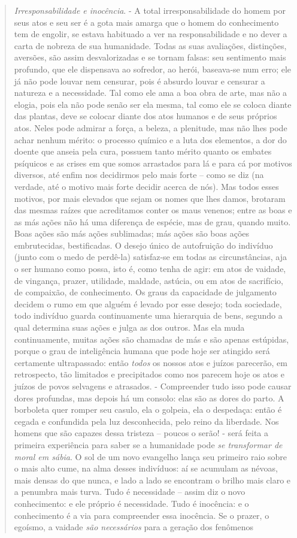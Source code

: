 \documentclass[
	12pt,				%
	openright,			%
	oneside,			%
	a4paper,			%
	english,			%
	french,				%
	spanish,			%
	brazil				%
	]{abntex2}
\begin{document}
\begin{quotation}
\textit{Irresponsabilidade e inocência}. - A total irresponsabilidade do homem por seus atos e seu ser é a gota mais amarga que o homem do conhecimento tem de engolir, se estava habituado a ver na responsabilidade e no dever a carta de nobreza de sua humanidade. Todas as suas avaliações, distinções, aversões, são assim desvalorizadas e se tornam falsas: seu sentimento mais profundo, que ele dispensava ao sofredor, ao herói, baseava-se num erro; ele já não pode louvar nem censurar, pois é absurdo louvar e censurar a natureza e a necessidade. Tal como ele ama a boa obra de arte, mas não a elogia, pois ela não pode senão ser ela mesma, tal como ele se coloca diante das plantas, deve se colocar diante dos atos humanos e de seus próprios atos. Neles pode admirar a força, a beleza, a plenitude, mas não lhes pode achar nenhum mérito: o processo químico e a luta dos elementos, a dor do doente que anseia pela cura, possuem tanto mérito quanto os embates psíquicos e as crises em que somos arrastados para lá e para cá por motivos diversos, até enfim nos decidirmos pelo mais forte – como se diz (na verdade, até o motivo mais forte decidir acerca de nós). Mas todos esses motivos, por mais elevados que sejam os nomes que lhes damos, brotaram das mesmas raízes que acreditamos conter os maus venenos; entre as boas e as más ações não há uma diferença de espécie, mas de grau, quando muito. Boas ações são más ações sublimadas; más ações são boas ações embrutecidas, bestificadas. O desejo único de autofruição do indivíduo (junto com o medo de perdê-la) satisfaz-se em todas as circunstâncias, aja o ser humano como possa, isto é, como tenha de agir: em atos de vaidade, de vingança, prazer, utilidade, maldade, astúcia, ou em atos de sacrifício, de compaixão, de conhecimento. Os graus da capacidade de julgamento decidem o rumo em que alguém é levado por esse desejo; toda sociedade, todo indivíduo guarda continuamente uma hierarquia de bens, segundo a qual determina suas ações e julga as dos outros. Mas ela muda continuamente, muitas ações são chamadas de más e são apenas estúpidas, porque o grau de inteligência humana que pode hoje ser atingido será certamente ultrapassado: então \textit{todos} os nossos atos e juízos parecerão, em retrospecto, tão limitados e precipitados como nos parecem hoje os atos e juízos de povos selvagens e atrasados. - Compreender tudo isso pode causar dores profundas, mas depois há um consolo: elas são as dores do parto. A borboleta quer romper seu casulo, ela o golpeia, ela o despedaça: então é cegada e confundida pela luz desconhecida, pelo reino da liberdade. Nos homens que são capazes dessa tristeza – poucos o serão! - será feita a primeira experiência para saber se a humanidade pode \textit{se transformar de moral em sábia}. O sol de um novo evangelho lança seu primeiro raio sobre o mais alto cume, na alma desses indivíduos: aí se acumulam as névoas, mais densas do que nunca, e lado a lado se encontram o brilho mais claro e a penumbra mais turva. Tudo é necessidade – assim diz o novo conhecimento: e ele próprio é necessidade. Tudo é inocência: e o conhecimento é a via para compreender essa inocência. Se o prazer, o egoísmo, a vaidade \textit{são necessários} para a geração dos fenômenos 
\end{quotation}
\end{document}
